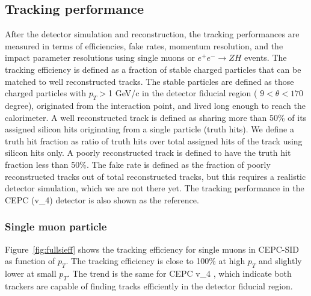 \subsection{Tracking performance} 
After the detector simulation and reconstruction, the tracking performances are  measured in terms of efficiencies, 
fake rates, momentum resolution, and the impact parameter resolutions using single muons or $e^+e^- \rightarrow ZH$ events. 
The tracking efficiency is defined as a fraction of stable charged particles that can be matched to well reconstructed tracks. 
The stable particles are defined as those charged particles with $p_T>$1 GeV/c in the detector fiducial region ( $9<\theta<170$ degree), 
originated from the interaction point, and lived long enough to reach the calorimeter. A well reconstructed 
track is defined as sharing more than 50\% of its assigned silicon hits originating from a single particle (truth hits). 
We define a truth hit fraction as ratio of truth hits over total assigned hits of the track using silicon hits only.  A poorly reconstructed track is 
defined to have the truth hit fraction less than 50\%. The fake rate is defined as the fraction of poorly reconstructed tracks out of 
total reconstructed tracks, but this requires a realistic detector simulation, which we are not there yet. 
The tracking performance in the CEPC (v\_4) detector is also shown as the reference.  
    
\subsubsection{Single muon particle} 

Figure~\ref{fig:fullsieff} shows the tracking efficiency for single muons in CEPC-SID  as function of $p_T$. 
The tracking efficiency is close to 100\% at high $p_T$ and slightly lower at small $p_T$. The trend is the same for CEPC v\_4 , which indicate both 
trackers are capable of finding tracks efficiently in the detector fiducial region. 

